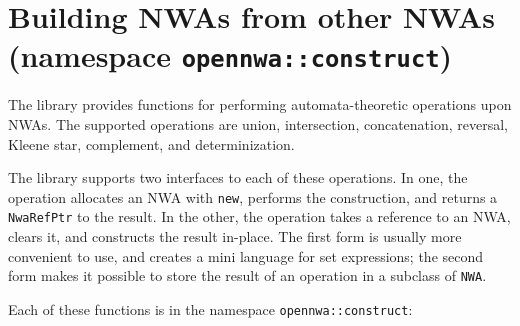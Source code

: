 \section{Building NWAs from other NWAs (namespace \texttt{opennwa::construct})}
\label{Se:Building NWAs}

The library provides functions for performing automata-theoretic operations upon
NWAs. The supported operations are union, intersection, concatenation,
reversal, Kleene star, complement, and determinization.

The library supports two interfaces to each of these operations. In one, the
operation allocates an NWA with \texttt{new}, performs the construction, and
returns a \texttt{NwaRefPtr} to the result.  In the other, the operation takes
a reference to an NWA, clears it, and constructs the result in-place. The
first form is usually more convenient to use, and creates a mini language for
set expressions; the second form makes it possible to store the result of an
operation in a subclass of \texttt{NWA}.

Each of these functions is in the namespace \texttt{opennwa::construct}:

